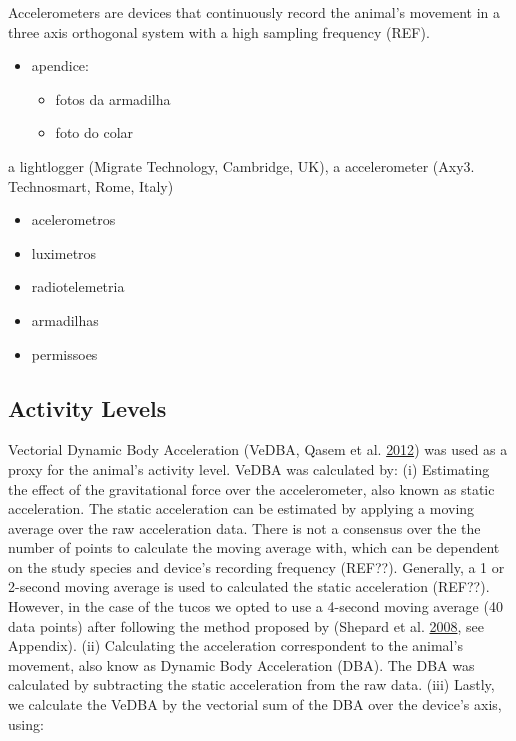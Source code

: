 \documentclass[msc,numbers,hidelinks]{coppe}
\providecommand{\tightlist}{%
  \setlength{\itemsep}{0pt}\setlength{\parskip}{0pt}}
\begin{document}
  Accelerometers are devices that continuously record the animal's movement in a three axis orthogonal system with a high sampling frequency (REF).
  \begin{itemize}
  \tightlist
  \item
    apendice:
    \begin{itemize}
    \tightlist
    \item
      fotos da armadilha
    \item
      foto do colar
    \end{itemize}
  \end{itemize}
  a lightlogger (Migrate Technology, Cambridge, UK), a accelerometer (Axy3. Technosmart, Rome, Italy)
  \begin{itemize}
  \tightlist
  \item
    acelerometros
  \item
    luximetros
  \item
    radiotelemetria
  \item
    armadilhas
  \item
    permissoes
  \end{itemize}
  \hypertarget{activity-levels}{%
  \subsection{Activity Levels}\label{activity-levels}}

  Vectorial Dynamic Body Acceleration (VeDBA, Qasem et al. \protect\hyperlink{ref-qasemTriAxialDynamicAcceleration2012}{2012}) was used as a proxy for the animal's activity level. VeDBA was calculated by: (i) Estimating the effect of the gravitational force over the accelerometer, also known as static acceleration. The static acceleration can be estimated by applying a moving average over the raw acceleration data. There is not a consensus over the the number of points to calculate the moving average with, which can be dependent on the study species and device's recording frequency (REF??). Generally, a 1 or 2-second moving average is used to calculated the static acceleration (REF??). However, in the case of the tucos we opted to use a 4-second moving average (40 data points) after following the method proposed by (Shepard et al. \protect\hyperlink{ref-shepardDerivationBodyMotion2008}{2008}, see Appendix). (ii) Calculating the acceleration correspondent to the animal's movement, also know as Dynamic Body Acceleration (DBA). The DBA was calculated by subtracting the static acceleration from the raw data. (iii) Lastly, we calculate the VeDBA by the vectorial sum of the DBA over the device's axis, using:
\end{document}
